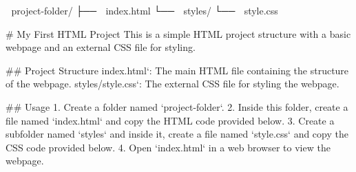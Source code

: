 📂 project-folder/
├── 📄 index.html
└── 📂 styles/
    └── 🎨 style.css



# My First HTML Project
This is a simple HTML project structure with a basic webpage and an external CSS file for styling.

## Project Structure
    index.html`: The main HTML file containing the structure of the webpage.
    styles/style.css`: The external CSS file for styling the webpage.

## Usage
1. Create a folder named `project-folder`.
2. Inside this folder, create a file named `index.html` and copy the HTML code provided below.
3. Create a subfolder named `styles` and inside it, create a file named `style.css` and copy the CSS code provided below.
4. Open `index.html` in a web browser to view the webpage.
